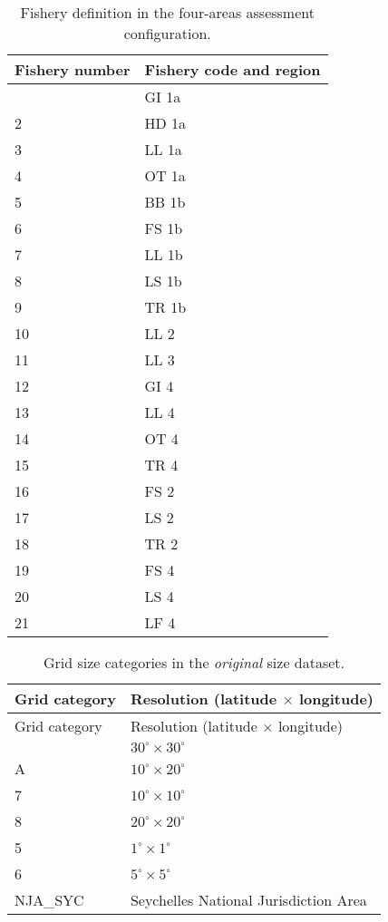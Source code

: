 \documentclass[
]{scrartcl}
\begin{document}
\begin{longtable}[]{@{}ll@{}}

\caption{\label{tbl-fleet-4A}Fishery definition in the four-areas
assessment configuration.}

\tabularnewline

\toprule\noalign{}
Fishery number & Fishery code and region \\
\midrule\noalign{}
\endhead
\bottomrule\noalign{}
\endlastfoot
1 & GI 1a \\
2 & HD 1a \\
3 & LL 1a \\
4 & OT 1a \\
5 & BB 1b \\
6 & FS 1b \\
7 & LL 1b \\
8 & LS 1b \\
9 & TR 1b \\
10 & LL 2 \\
11 & LL 3 \\
12 & GI 4 \\
13 & LL 4 \\
14 & OT 4 \\
15 & TR 4 \\
16 & FS 2 \\
17 & LS 2 \\
18 & TR 2 \\
19 & FS 4 \\
20 & LS 4 \\
21 & LF 4 \\

\end{longtable}

\newpage{}

\begin{longtable}[]{@{}ll@{}}
\caption{Grid size categories in the \emph{original} size
dataset.}\label{tbl-grid-size}\tabularnewline
\toprule\noalign{}
Grid category & Resolution (latitude \(\times\) longitude) \\
\midrule\noalign{}
\endfirsthead
\toprule\noalign{}
Grid category & Resolution (latitude \(\times\) longitude) \\
\midrule\noalign{}
\endhead
\bottomrule\noalign{}
\endlastfoot
9 & \(30^\circ\times 30^\circ\) \\
A & \(10^\circ\times 20^\circ\) \\
7 & \(10^\circ\times 10^\circ\) \\
8 & \(20^\circ\times 20^\circ\) \\
5 & \(1^\circ\times 1^\circ\) \\
6 & \(5^\circ\times 5^\circ\) \\
NJA\_SYC & Seychelles National Jurisdiction Area \\
\end{longtable}
\end{document}
